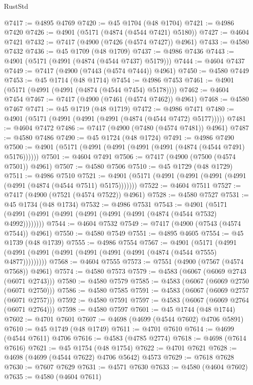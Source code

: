 \begin{lexlean}{RustStd}
\begin{coremodule}
@7417 := @4895 @4769
@7420 := @45 @1704 (@48 @1704)
@7421 := @4986 @7420
@7426 := @4901 (@5171 (@4874 (@4544 @7421) @5180))
@7427 := @4604 @7421
@7432 := @7417 (@4900 (@7426 (@4574 @7427)) @4961)
@7433 := @4580 @7432
@7436 := @45 @1709 (@48 @1709)
@7437 := @4986 @7436
@7443 := @4901 (@5171 (@4991 (@4874 (@4544 @7437) @5179)))
@7444 := @4604 @7437
@7449 := @7417 (@4900 (@7443 (@4574 @7444)) @4961)
@7450 := @4580 @7449
@7453 := @45 @1714 (@48 @1714)
@7454 := @4986 @7453
@7461 := @4901 (@5171 (@4991 (@4991 (@4874 (@4544 @7454) @5178))))
@7462 := @4604 @7454
@7467 := @7417 (@4900 (@7461 (@4574 @7462)) @4961)
@7468 := @4580 @7467
@7471 := @45 @1719 (@48 @1719)
@7472 := @4986 @7471
@7480 := @4901 (@5171 (@4991 (@4991 (@4991 (@4874 (@4544 @7472) @5177)))))
@7481 := @4604 @7472
@7486 := @7417 (@4900 (@7480 (@4574 @7481)) @4961)
@7487 := @4580 @7486
@7490 := @45 @1724 (@48 @1724)
@7491 := @4986 @7490
@7500 := @4901 (@5171 (@4991 (@4991 (@4991 (@4991 (@4874 (@4544 @7491) @5176))))))
@7501 := @4604 @7491
@7506 := @7417 (@4900 (@7500 (@4574 @7501)) @4961)
@7507 := @4580 @7506
@7510 := @45 @1729 (@48 @1729)
@7511 := @4986 @7510
@7521 := @4901 (@5171 (@4991 (@4991 (@4991 (@4991 (@4991 (@4874 (@4544 @7511) @5175)))))))
@7522 := @4604 @7511
@7527 := @7417 (@4900 (@7521 (@4574 @7522)) @4961)
@7528 := @4580 @7527
@7531 := @45 @1734 (@48 @1734)
@7532 := @4986 @7531
@7543 := @4901 (@5171 (@4991 (@4991 (@4991 (@4991 (@4991 (@4991 (@4874 (@4544 @7532) @4992))))))))
@7544 := @4604 @7532
@7549 := @7417 (@4900 (@7543 (@4574 @7544)) @4961)
@7550 := @4580 @7549
@7551 := @4895 @4605
@7554 := @45 @1739 (@48 @1739)
@7555 := @4986 @7554
@7567 := @4901
    (@5171 (@4991 (@4991 (@4991 (@4991 (@4991 (@4991 (@4991 (@4874 (@4544 @7555) @4877)))))))))
@7568 := @4604 @7555
@7573 := @7551 (@4900 (@7567 (@4574 @7568)) @4961)
@7574 := @4580 @7573
@7579 := @4583 (@6067 (@6069 @2743 (@6071 @2743)))
@7580 := @4580 @7579
@7585 := @4583 (@6067 (@6069 @2750 (@6071 @2750)))
@7586 := @4580 @7585
@7591 := @4583 (@6067 (@6069 @2757 (@6071 @2757)))
@7592 := @4580 @7591
@7597 := @4583 (@6067 (@6069 @2764 (@6071 @2764)))
@7598 := @4580 @7597
@7601 := @45 @1744 (@48 @1744)
@7602 := @4701 @7601
@7607 := @4698 (@4699 (@4544 @7602) @4706 @5891)
@7610 := @45 @1749 (@48 @1749)
@7611 := @4701 @7610
@7614 := @4699 (@4544 @7611) @4706
@7616 := @4583 (@4785 @2774)
@7618 := @4698 (@7614 @7616)
@7621 := @45 @1754 (@48 @1754)
@7622 := @4701 @7621
@7628 := @4698 (@4699 (@4544 @7622) @4706 @5642) @4573
@7629 := @7618 @7628
@7630 := @7607 @7629
@7631 := @4571 @7630
@7633 := @4580 (@4604 @7602)
@7635 := @4580 (@4604 @7611)

\end{coremodule}
\end{lexlean}
